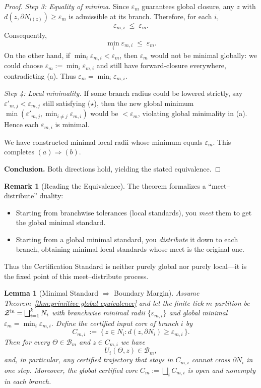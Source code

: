 \documentclass[12pt]{article}
\theoremstyle{definition}
\newtheorem{remark}{Remark}[section]
\theoremstyle{plain}
\newtheorem{lemma}{Lemma}[section]
\begin{document}
\begin{proof}
\smallskip
\emph{Step 3: Equality of minima.}  
Since \(\varepsilon_m\) guarantees global closure, any \(z\) with
\(d(z,\partial N_{i(z)})\ge\varepsilon_m\) is admissible at its branch.
Therefore, for each \(i\),
\[
  \varepsilon_{m,i}\;\le\;\varepsilon_m.
\]
Consequently,
\[
  \min_i\varepsilon_{m,i}\;\le\;\varepsilon_m.
\]
On the other hand, if 
\(\min_i\varepsilon_{m,i}<\varepsilon_m\),
then \(\varepsilon_m\) would not be minimal globally: we could choose
\(\widehat\varepsilon_m:=\min_i\varepsilon_{m,i}\)
and still have forward‑closure everywhere, contradicting (a).  
Thus \(\varepsilon_m=\min_i\varepsilon_{m,i}\).

\smallskip
\emph{Step 4: Local minimality.}  
If some branch radius could be lowered strictly, say \(\varepsilon'_{m,j}<\varepsilon_{m,j}\) still satisfying (\(\star\)), then the new global minimum 
\(\min(\varepsilon'_{m,j},\min_{i\neq j}\varepsilon_{m,i})\) would be \(<\varepsilon_m\), violating global minimality in (a).  
Hence each \(\varepsilon_{m,i}\) is minimal.

\smallskip
We have constructed minimal local radii whose minimum equals \(\varepsilon_m\).  
This completes \((a)\Rightarrow(b)\).

\medskip
\noindent\textbf{Conclusion.}  
Both directions hold, yielding the stated equivalence.
\end{proof}

\begin{remark}[Reading the Equivalence]
The theorem formalizes a “meet–distribute” duality:
\begin{itemize}
  \item Starting from branchwise tolerances (local standards), you \emph{meet} them to get the global minimal standard.
  \item Starting from a global minimal standard, you \emph{distribute} it down to each branch, obtaining minimal local standards whose meet is the original one.
\end{itemize}
Thus the Certification Standard is neither purely global nor purely local—it is the fixed point of this meet–distribute process.
\end{remark}

\begin{lemma}[Minimal Standard $\Rightarrow$ Boundary Margin]
\label{lem:no-crossing-from-minimal}
Assume Theorem~\ref{thm:primitive-global-equivalence} and let the finite tick-$m$ partition be $\mathcal Z^{\rm in}=\bigsqcup_{i=1}^k N_i$ with branchwise minimal radii $\{\varepsilon_{m,i}\}$ and global minimal $\varepsilon_m=\min_i\varepsilon_{m,i}$. Define the \emph{certified input core} of branch $i$ by
\[
  C_{m,i}\ :=\ \{\, z\in N_i : d(z,\partial N_i)\ge \varepsilon_{m,i}\,\}.
\]
Then for every $\Theta\in\mathcal B_m$ and $z\in C_{m,i}$ we have
\[
  U_i(\Theta,z)\in\mathcal B_m,
\]
and, in particular, any certified trajectory that stays in $C_{m,i}$ cannot cross $\partial N_i$ in one step. Moreover, the global certified core $C_m:=\bigsqcup_i C_{m,i}$ is open and nonempty in each branch.
\end{lemma}
\end{document}
